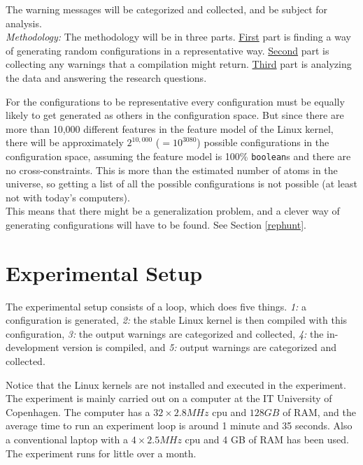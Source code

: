 \documentclass[a4paper,11pt]{report}
\begin{document}
The warning messages will be categorized and collected, and be subject for 
analysis.
\\

\emph{Methodology:}
The methodology will be in three parts. \underline{First} part is finding a way of
generating random configurations in a representative way. \underline{Second} part is 
collecting any warnings that a compilation might return. \underline{Third} part is 
analyzing the data and answering the research questions.
\\

        \def \fn{Not counting cross-tree contraints, but also saying 
        everything is a \texttt{boolean} and not \texttt{tristate}, or 
        \texttt{string}.}

For the configurations to be representative every configuration must be equally 
likely to get generated as others in the configuration space. But since there are more than 
10,000 different features in the feature model of the Linux kernel, there will 
be approximately $2^{10,000}$ ($=10^{3080}$) possible configurations in the 
configuration space, assuming the feature model is 100\% \texttt{boolean}s and 
there are no cross-constraints.  This is more than the estimated number of 
atoms in the universe, so getting a list of all the possible configurations is 
not possible (at least not with today's computers).
\\

This means that there might be a generalization problem, and a clever way of 
generating configurations will have to be found. See Section \ref{rephunt}.



            \section{Experimental Setup}
The experimental setup consists of a loop, which does five things. \emph{1:} a 
configuration is generated, \emph{2:} the stable Linux kernel is then compiled with 
this configuration, \emph{3:} the output warnings are categorized and 
collected, \emph{4:} the in-development version is compiled, and \emph{5:} output warnings are categorized and collected.

Notice that the Linux kernels are not installed and executed in the experiment.
\\

The experiment is mainly carried out on a computer at the IT University of 
Copenhagen. The computer has a $32\times2.8 MHz$ cpu and $128 GB$ of RAM, and 
the average time to run an experiment loop is around 1 minute and 35 seconds. 
Also a conventional laptop with a $4\times2.5 MHz$  cpu and 4 GB of RAM has 
been used. The experiment runs for little over a month.
\\
\end{document}
